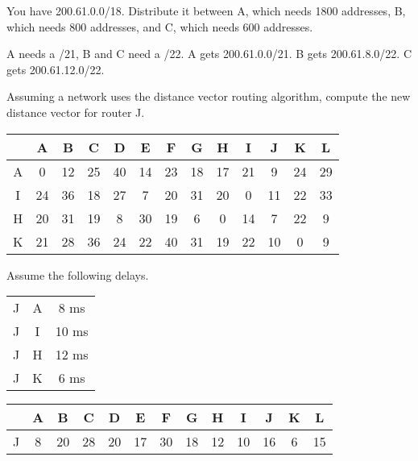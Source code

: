 \begin{Exercise}
You have 200.61.0.0/18. Distribute it between A, which needs 1800 addresses, B, which needs 800 addresses, and C, which needs 600 addresses.
\end{Exercise}
\begin{Answer}
A needs a /21, B and C need a /22.
A gets 200.61.0.0/21. B gets 200.61.8.0/22. C gets 200.61.12.0/22.
\end{Answer}

\begin{Exercise}
Assuming a network uses the distance vector routing algorithm, compute the new distance vector for router J.

\begin{center}
\begin{tabular}{c|c|c|c|c|c|c|c|c|c|c|c|c}
      & A & B & C & D & E & F & G & H & I & J & K & L \\ \hline
    A & 0 & 12 & 25 & 40 & 14 & 23 & 18 & 17 & 21 & 9 & 24 & 29 \\
    I & 24 & 36 & 18 & 27 & 7 & 20 & 31 & 20 & 0 & 11 & 22 & 33 \\
    H & 20 & 31 & 19 & 8 & 30 & 19 & 6 & 0 & 14 & 7 & 22 & 9 \\
    K & 21 & 28 & 36 & 24 & 22 & 40 & 31 & 19 & 22 & 10 & 0 & 9
\end{tabular}
\end{center}

Assume the following delays.

\begin{center}
\begin{tabular}{c|c|c}
    J & A &  8 ms \\
    J & I & 10 ms \\
    J & H & 12 ms \\
    J & K &  6 ms
\end{tabular}
\end{center}
\end{Exercise}
\begin{Answer}
\begin{center}
\begin{tabular}{c|c|c|c|c|c|c|c|c|c|c|c|c}
      & A & B & C & D & E & F & G & H & I & J & K & L \\ \hline
    J & 8 & 20 & 28 & 20 & 17 & 30 & 18 & 12 & 10 & 16 & 6 & 15
\end{tabular}
\end{center}
\end{Answer}


